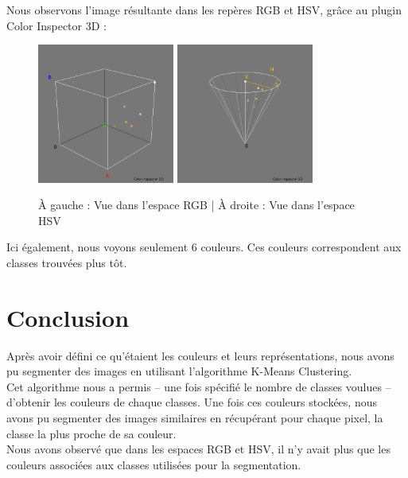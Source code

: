 \documentclass[a4paper]{article}
\begin{document}
Nous observons l'image résultante dans les repères RGB et HSV, grâce au plugin Color Inspector 3D :

\begin{figure}[H]
\begin{center}
  \includegraphics[width=170px]{../resultats/cas_4_dalton_ligne_rgb.png}
\includegraphics[width=170px]{../resultats/cas_4_dalton_ligne_hsv.png}
\end{center}
\caption{À gauche : Vue dans l'espace RGB | À droite : Vue dans l'espace HSV}
\end{figure}

Ici également, nous voyons seulement 6 couleurs. Ces couleurs correspondent aux classes trouvées plus tôt.

\clearpage

\section{Conclusion}
Après avoir défini ce qu'étaient les couleurs et leurs représentations, nous avons pu segmenter des images en utilisant l'algorithme K-Means Clustering.\\

Cet algorithme nous a permis -- une fois spécifié le nombre de classes voulues -- d'obtenir les couleurs de chaque classes. Une fois ces couleurs stockées, nous avons pu segmenter des images similaires en récupérant pour chaque pixel, la classe la plus proche de sa couleur.\\

Nous avons observé que dans les espaces RGB et HSV, il n'y avait plus que les couleurs associées aux classes utilisées pour la segmentation.

\clearpage
\end{document}
